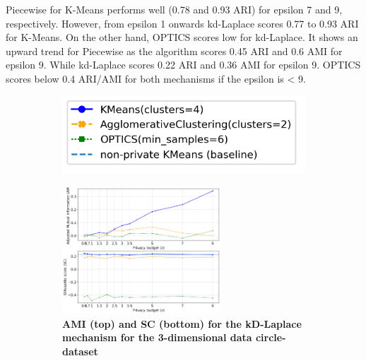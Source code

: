 \begin{figure}[H]
\begin{subfigure}{1\textwidth}
    \end{subfigure}
    \label{fig:validation-heart-dataset_comparison_3d-laplace}
\end{figure}
Piecewise for K-Means performs well (0.78 and 0.93 ARI) for epsilon 7 and 9, respectively.
However, from epsilon 1 onwards kd-Laplace scores 0.77 to 0.93 ARI for K-Means.
On the other hand, OPTICS scores low for kd-Laplace.
It shows an upward trend for Piecewise as the algorithm scores 0.45 ARI and 0.6 AMI for epsilon 9.
While kd-Laplace scores 0.22 ARI and 0.36 AMI for epsilon 9.
OPTICS scores below 0.4 ARI/AMI for both mechanisms if the epsilon is < 9.
\newpage
\begin{figure}[H]
    \centering
    \begin{subfigure}{0.3\textwidth}
        \includegraphics[width=\textwidth]{Results/kd-laplace/kd-Laplace/circle-dataset/legend_3.png}
    \end{subfigure}
    \begin{subfigure}{1\textwidth}
        \caption{\textbf{AMI (top) and SC (bottom) for the kD-Laplace mechanism for the 3-dimensional data circle-dataset}}
        \centering
        \includegraphics[width=0.65\textwidth]{Results/kd-laplace/kd-Laplace/circle-dataset/ami-and-sc_3_dimensions.png}
        \centering
    \end{subfigure}
    \begin{subfigure}{1\textwidth}

\end{subfigure}
\end{figure}
